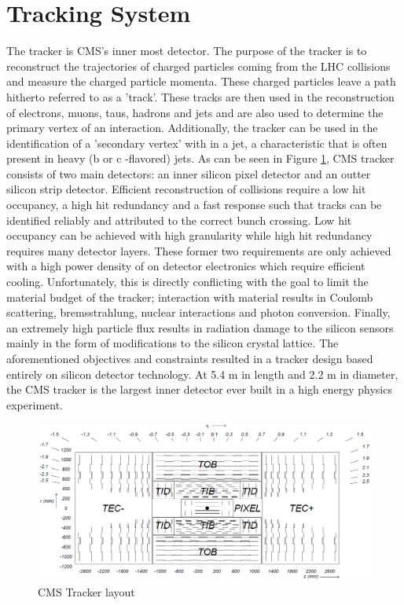 \section{Tracking System}
The tracker is CMS's inner most detector. The purpose of the tracker is to reconstruct the
trajectories of charged particles coming from the LHC collisions and measure the charged particle momenta.
These charged particles leave a path hitherto referred to as a 'track'.%
These tracks are then used in the reconstruction of electrons, muons, taus, hadrons and jets 
and are also used to determine the primary vertex of an interaction. Additionally,
the tracker can be used in the identification of a 'secondary vertex' with in a jet,
a characteristic that is often present
in heavy (b or c -flavored) jets.
As can be seen in Figure \ref{fig:trackerLayout}, CMS tracker consists of two main detectors: an inner silicon pixel detector and an outter
silicon strip detector.
Efficient reconstruction of collisions require a low hit occupancy, a high hit redundancy and a
fast response such that tracks can be identified reliably and attributed to the correct bunch crossing.
Low hit occupancy can be achieved with high granularity while high hit redundancy requires
many detector layers. These former two requirements are only achieved with a 
high power density of on detector electronics which require efficient cooling. %
Unfortunately, this is directly conflicting with the goal to limit the material 
budget of the tracker; interaction with material results in Coulomb scattering,
bremsstrahlung, nuclear interactions and photon conversion. Finally, an extremely
high particle flux results in radiation damage to the silicon sensors mainly 
in the form of modifications to the silicon crystal lattice. %
The aforementioned objectives and constraints resulted in a tracker design 
based entirely on silicon detector technology. 
At 5.4 m in length and 2.2 m in diameter, the CMS tracker is the largest inner
detector ever built in a high energy physics experiment.
\begin{figure}[hb]
  \centering
	\includegraphics[width=1\textwidth]{trackerImages/trackerLayout.png}
  	\caption[CMS Tracker Layout]
   	{CMS Tracker layout}
	\label{fig:trackerLayout}
\end{figure}



